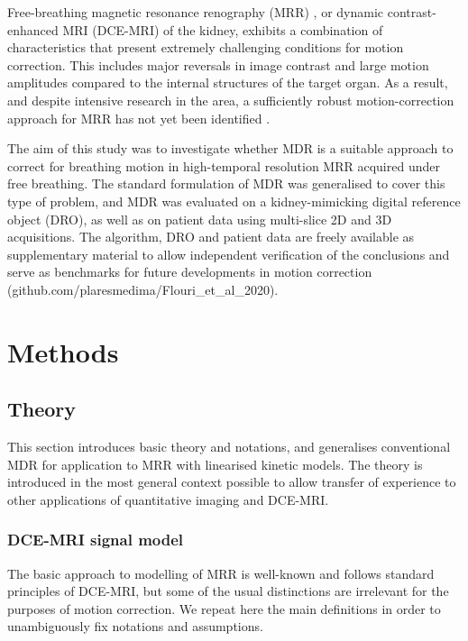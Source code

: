 \documentclass[num-refs]{wiley-article}
\begin{document}
Free-breathing magnetic resonance renography (MRR) \cite{Basak2019}, or dynamic contrast-enhanced MRI (DCE-MRI) of the kidney, exhibits a combination of characteristics that present extremely challenging conditions for motion correction. This includes major reversals in image contrast and large motion amplitudes compared to the internal structures of the target organ. As a result, and despite intensive research in the area, a sufficiently robust motion-correction approach for MRR has not yet been identified \cite{Zollner2020}. 

The aim of this study was to investigate whether MDR is a suitable approach to correct for breathing motion in high-temporal resolution MRR acquired under free breathing. The standard formulation of MDR was generalised to cover this type of problem, and MDR was evaluated on a kidney-mimicking digital reference object (DRO), as well as on patient data using multi-slice 2D and 3D acquisitions. The algorithm, DRO and patient data are freely available as supplementary material to allow independent verification of the conclusions and serve as benchmarks for future developments in motion correction (github.com/plaresmedima/Flouri_et_al_2020).

\section{Methods}

\subsection{Theory}

This section introduces basic theory and notations, and generalises conventional MDR for application to MRR with linearised kinetic models. The theory is introduced in the most general context possible to allow transfer of experience to other applications of quantitative imaging and DCE-MRI.

\subsubsection{DCE-MRI signal model}

The basic approach to modelling of MRR is well-known \cite{Basak2019} and follows standard principles of DCE-MRI, but some of the usual distinctions are irrelevant for the purposes of motion correction. We repeat here the main definitions in order to unambiguously fix notations and assumptions. 
\end{document}
